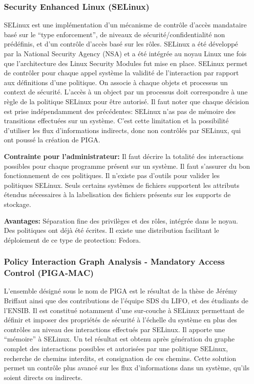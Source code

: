 \documentclass[pdftex,a4paper,titlepage,11pt]{article}
\begin{document}
\subsubsection{Security Enhanced Linux (SELinux)}

SELinux est une implémentation d'un mécanisme de contrôle d'accès mandataire
basé sur le ``type enforcement'', de niveaux de sécurité/confidentialité non
prédéfinis, et d'un contrôle d'accès basé sur les rôles. SELinux a été développé
par la National Security Agency (NSA) et a été intégrée au noyau Linux une fois
que l'architecture des Linux Security Modules fut mise en place. SELinux permet
de contrôler pour chaque appel système la validité de l'interaction par rapport
aux définitions d'une politique. On associe à chaque objets et processus un
context de sécurité. L'accès à un object par un processus doit correspondre à
une règle de la politique SELinux pour être autorisé. Il faut noter que chaque
décision est prise indépendamment des précédentes: SELinux n'as pas de mémoire
des transitions effectuées sur un système. C'est cette limitation et la
possibilité d'utiliser les flux d'informations indirects, donc non contrôlés par
SELinux, qui ont poussé la création de PIGA.

\begin{list}{}{}
 \item \textbf{Contrainte pour l'administrateur:} Il faut décrire la totalité
des interactions possibles pour chaque programme présent sur un système. Il faut
s'assurer du bon fonctionnement de ces politiques. Il n'existe pas d'outils pour
valider les politiques SELinux. Seuls certains systèmes de fichiers supportent
les attributs étendus nécessaires à la labelisation des fichiers présents sur
les supports de stockage.
 \item \textbf{Avantages:} Séparation fine des privilèges et des rôles, intégrée
dans le noyau. Des politiques ont déjà été écrites. Il existe une distribution
facilitant le déploiement de ce type de protection: Fedora.
\end{list}

\subsubsection{Policy Interaction Graph Analysis - Mandatory Access Control
(PIGA-MAC)}

L'ensemble désigné sous le nom de PIGA est le résultat de la thèse de Jérémy
Briffaut ainsi que des contributions de l'équipe SDS du LIFO, et des étudiants
de l'ENSIB. Il est constitué notamment d'une sur-couche à SELinux permettant de
définir et imposer des propriétés de sécurité à l'échelle du système en plus des
contrôles au niveau des interactions effectués par SELinux. Il apporte une
``mémoire'' à SELinux. Un tel résultat est obtenu après génération du graphe
complet des interactions possibles et autorisées par une politique SELinux,
recherche de chemins interdits, et consignation de ces chemins. Cette solution
permet un contrôle plus avancé sur les flux d'informations dans un système,
qu'ils soient directs ou indirects.
\end{document}

